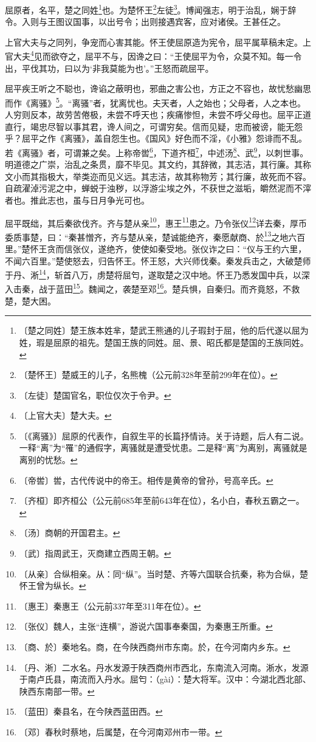 \documentclass[12pt,UTF-8,openany,a4]{ctexbook}
\begin{document}
\begin{large}
    
    屈原者，名平，楚之同姓\footnote{〔楚之同姓〕\yiwen 楚王族本姓芈，楚武王熊通的儿子瑕封于屈，他的后代遂以屈为姓，瑕是屈原的祖先。楚国王族的同姓。屈、景、昭氏都是楚国的王族同姓。}也。为楚怀王\footnote{〔楚怀王〕\yiwen 楚威王的儿子，名熊槐（公元前328年至前299年在位）。}左徒\footnote{〔左徒〕\yiwen 楚国官名，职位仅次于令尹。}。博闻强志，明于治乱，娴于辞令。入则与王图议国事，以出号令；出则接遇宾客，应对诸侯。王甚任之。
    
    上官大夫与之同列，争宠而心害其能。怀王使屈原造为宪令，屈平属草稿未定。上官大夫\footnote{〔上官大夫〕\yiwen 楚大夫。}见而欲夺之，屈平不与，因谗之曰：“王使屈平为令，众莫不知。每一令出，平伐其功，曰以为‘非我莫能为也’。”王怒而疏屈平。
    
    屈平疾王听之不聪也，谗谄之蔽明也，邪曲之害公也，方正之不容也，故忧愁幽思而作《离骚》\footnote{〔《离骚》〕\yiwen 屈原的代表作，自叙生平的长篇抒情诗。关于诗题，后人有二说。一释“离”为“罹”的通假字，离骚就是遭受忧患。二是释“离”为离别，离骚就是离别的忧愁。}。“离骚”者，犹离忧也。夫天者，人之始也；父母者，人之本也。人穷则反本，故劳苦倦极，未尝不呼天也；疾痛惨怛，未尝不呼父母也。屈平正道直行，竭忠尽智以事其君，谗人间之，可谓穷矣。信而见疑，忠而被谤，能无怨乎？屈平之作《离骚》，盖自怨生也。《国风》好色而不淫，《小雅》怨诽而不乱。若《离骚》者，可谓兼之矣。上称帝喾\footnote{〔帝喾〕\yiwen 喾，古代传说中的帝王。相传是黄帝的曾孙，号高辛氏。}，下道齐桓\footnote{〔齐桓〕\yiwen 即齐桓公（公元前685年至前643年在位），名小白，春秋五霸之一。}，中述汤\footnote{〔汤〕\yiwen 商朝的开国君主。}、武\footnote{〔武〕\yiwen 指周武王，灭商建立西周王朝。}，以刺世事。明道德之广崇，治乱之条贯，靡不毕见。其文约，其辞微，其志洁，其行廉。其称文小而其指极大，举类迩而见义远。其志洁，故其称物芳；其行廉，故死而不容。自疏濯淖污泥之中，蝉蜕于浊秽，以浮游尘埃之外，不获世之滋垢，皭然泥而不滓者也。推此志也，虽与日月争光可也。
    
    屈平既绌，其后秦欲伐齐。齐与楚从亲\footnote{〔从亲〕\yiwen 合纵相亲。从：同“纵”。当时楚、齐等六国联合抗秦，称为合纵，楚怀王曾为纵长。}，惠王\footnote{〔惠王〕\yiwen 秦惠王（公元前337年至311年在位）。}患之。乃令张仪\footnote{〔张仪〕\yiwen 魏人，主张“连横”，游说六国事奉秦国，为秦惠王所重。}详去秦，厚币委质事楚，曰：“秦甚憎齐，齐与楚从亲，楚诚能绝齐，秦愿献商、於\footnote{〔商、於〕\yiwen 秦地名。商，在今陕西商州市东南。於，在今河南内乡东。}之地六百里。”楚怀王贪而信张仪，遂绝齐，使使如秦受地。张仪诈之曰：“仪与王约六里，不闻六百里。”楚使怒去，归告怀王。怀王怒，大兴师伐秦。秦发兵击之，大破楚师于丹、淅\footnote{〔丹、淅〕\yiwen 二水名。丹水发源于陕西商州市西北，东南流入河南。淅水，发源于南卢氏县，南流而入丹水。屈匄：（gài）：楚大将军。汉中：今湖北西北部、陕西东南部一带。}，斩首八万，虏楚将屈匄，遂取楚之汉中地。怀王乃悉发国中兵，以深入击秦，战于蓝田\footnote{〔蓝田〕\yiwen 秦县名，在今陕西蓝田西。}。魏闻之，袭楚至邓\footnote{〔邓〕\yiwen 春秋时蔡地，后属楚，在今河南邓州市一带。}。楚兵惧，自秦归。而齐竟怒，不救楚，楚大困。
    

\end{large}
\end{document}
